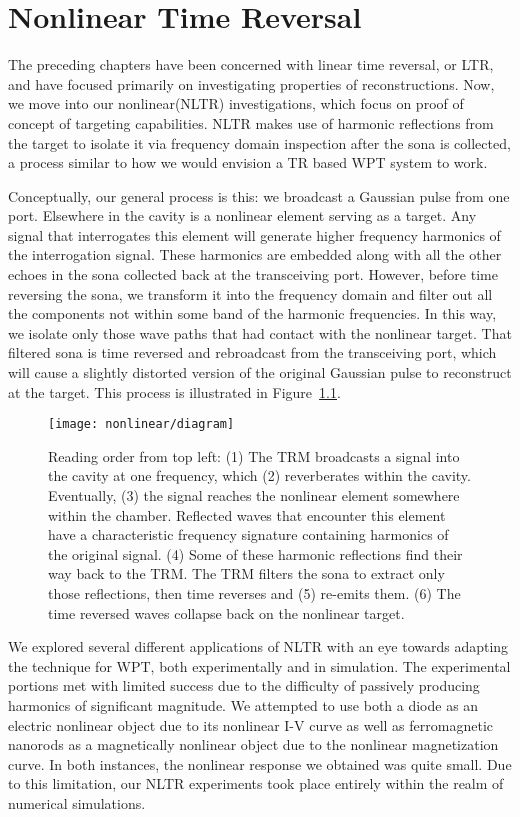 \chapter{Nonlinear Time Reversal}
\label{ch:nltr}

The preceding chapters have been concerned with linear time reversal, or LTR, and have focused primarily on investigating properties of reconstructions. Now, we move into our nonlinear(NLTR) investigations, which focus on proof of concept of targeting capabilities. NLTR makes use of harmonic reflections from the target to isolate it via frequency domain inspection after the sona is collected, a process similar to how we would envision a TR based WPT system to work.

Conceptually, our general process is this: we broadcast a Gaussian pulse from one port. Elsewhere in the cavity is a nonlinear element serving as a target. Any signal that interrogates this element will generate higher frequency harmonics of the interrogation signal. These harmonics are embedded along with all the other echoes in the sona collected back at the transceiving port. However, before time reversing the sona, we transform it into the frequency domain and filter out all the components not within some band of the harmonic frequencies. In this way, we isolate only those wave paths that had contact with the nonlinear target. That filtered sona is time reversed and rebroadcast from the transceiving port, which will cause a slightly distorted version of the original Gaussian pulse to reconstruct at the target. This process is illustrated in Figure~\ref{fig:nonlinear-diagram}.

\begin{figure}[]
\centering
\texttt{[image: nonlinear/diagram]}
    \caption[Conceptual overview of nonlinear time reversal]{Reading order from top left: (1) The TRM broadcasts a signal into the cavity at one frequency, which (2) reverberates within the cavity. Eventually, (3) the signal reaches the nonlinear element somewhere within the chamber. Reflected waves that encounter this element have a characteristic frequency signature containing harmonics of the original signal. (4) Some of these harmonic reflections find their way back to the TRM. The TRM filters the sona to extract only those reflections, then time reverses and (5) re-emits them. (6) The time reversed waves collapse back on the nonlinear target.}
    \label{fig:nonlinear-diagram}
\end{figure}

We explored several different applications of NLTR with an eye towards adapting the technique for WPT, both experimentally and in simulation. The experimental portions met with limited success due to the difficulty of passively producing harmonics of significant magnitude. We attempted to use both a diode as an electric nonlinear object due to its nonlinear I-V curve as well as ferromagnetic nanorods as a magnetically nonlinear object due to the nonlinear magnetization curve. In both instances, the nonlinear response we obtained was quite small. Due to this limitation, our NLTR experiments took place entirely within the realm of numerical simulations.
